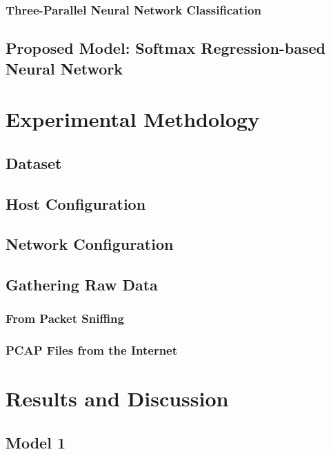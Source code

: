 \documentclass[12pt]{article}
\begin{document}
			\subsubsection{Three-Parallel Neural Network Classification}
			\lipsum[1-2]
		\subsection{Proposed Model: Softmax Regression-based Neural Network}
		\lipsum[1-4]
	
	
	\cleardoublepage
	\section{Experimental Methdology}
	\lipsum[1]
		\subsection{Dataset}
		\lipsum[1-2]
		\subsection{Host Configuration}
		\lipsum[1-2]
		\subsection{Network Configuration}
		\lipsum[1-3]
		\subsection{Gathering Raw Data}
		\lipsum[1]
			\subsubsection{From Packet Sniffing}
			\lipsum[1-2]
			\subsubsection{PCAP Files from the Internet \cite{Chianese2017}}
			\lipsum[1-2]
	
	\cleardoublepage
	\section{Results and Discussion}
	\lipsum[1]
		\subsection{Model 1}
		\lipsum[1-3]
\end{document}
